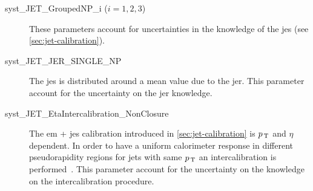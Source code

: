 \begin{description}
\item[syst\_JET\_GroupedNP\_i ($i = 1, 2, 3$)] These parameters account for
  uncertainties in the knowledge of the \gls{jes} (see
  \cref{sec:jet-calibration}).
\item[syst\_JET\_JER\_SINGLE\_NP] The \gls{jes} is distributed around a mean
  value due to the \gls{jer}. This parameter account for the uncertainty on the
  \gls{jer} knowledge.
\item[syst\_JET\_EtaIntercalibration\_NonClosure] The \gls{em} + \gls{jes}
  calibration introduced in \cref{sec:jet-calibration} is $p_\mathrm{\, T}$ and $\eta$
  dependent. In order to have a uniform calorimeter response in different
  pseudorapidity regions for jets with same $p_\mathrm{\, T}$ an intercalibration is
  performed~\cite{JESEMCalibration}. This parameter account for the uncertainty
  on the knowledge on the intercalibration procedure.
\end{description}
